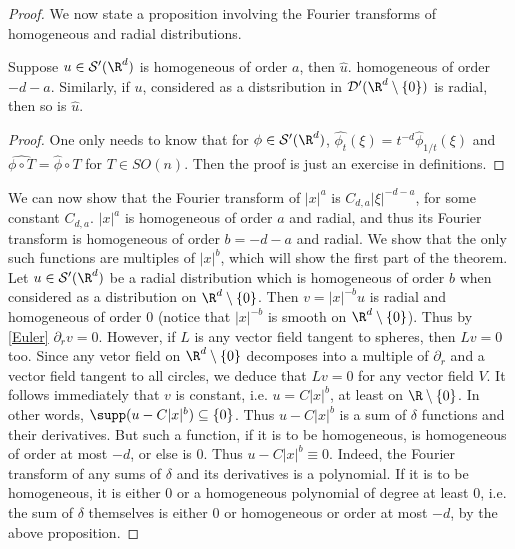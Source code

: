 \documentclass[12pt]{article}
\begin{document}
\begin{proof}
We now state a proposition involving the Fourier transforms of homogeneous and radial distributions.
\begin{prop}Suppose $u \in \mathcal S'(\R^d)$ is homogeneous of order $a$, then $\hat{u}$. homogeneous of order $-d-a$. Similarly, if $u$, considered as a distsribution in $\mathcal D'(\R^d\setminus\{0\})$ is radial, then so is $\hat{u}$.\end{prop}
\begin{proof}One only needs to know that for $\phi \in \mathcal S'(\R^d)$, $\hat{\phi_t}(\xi) = t^{-d}\hat{\phi}_{1/t}(\xi)$ and $\widehat{\phi\circ T} = \hat{\phi}\circ T$ for $T \in SO(n)$. Then the proof is just an exercise in definitions.\end{proof}

We can now show that the Fourier transform of $|x|^a$ is $C_{d,a}|\xi|^{-d-a}$, for some constant $C_{d,a}$. $|x|^a$ is homogeneous of order $a$ and radial, and thus its Fourier transform is homogeneous of order $b = -d-a$ and radial. We show that the only such functions are multiples of $|x|^b$, which will show the first part of the theorem. Let $u \in \mathcal S'(\R^d)$ be a radial distribution which is homogeneous of order $b$ when considered as a distribution on $\R^d\setminus\{0\}$. Then $v = |x|^{-b}u$ is radial and homogeneous of order $0$ (notice that $|x|^{-b}$ is smooth on $\R^d\setminus\{0\}$). Thus by \eqref{Euler} $\partial_r v = 0$. However, if $L$ is any vector field tangent to spheres, then $Lv = 0$ too. Since any vetor field on $\R^d\setminus\{0\}$ decomposes into a multiple of $\partial_r$ and a vector field tangent to all circles, we deduce that $Lv = 0$ for any vector field $V$. It follows immediately that $v$ is constant, i.e. $u = C|x|^{b}$, at least on $\R\setminus\{0\}$. In other words, $\supp (u-C|x|^{b}) \subseteq \{0\}$. Thus $u-C|x|^{b}$ is a sum of $\delta$ functions and their derivatives. But such a function, if it is to be homogeneous, is homogeneous of order at most $-d$, or else is $0$. Thus $u-C|x|^b \equiv 0$. Indeed, the Fourier transform of any sums of $\delta$ and its derivatives is a polynomial. If it is to be homogeneous, it is either $0$ or a homogeneous polynomial of degree at least $0$, i.e. the sum of $\delta$ themselves is either $0$ or homogeneous or order at most $-d$, by the above proposition.


\end{proof}
\end{document}
